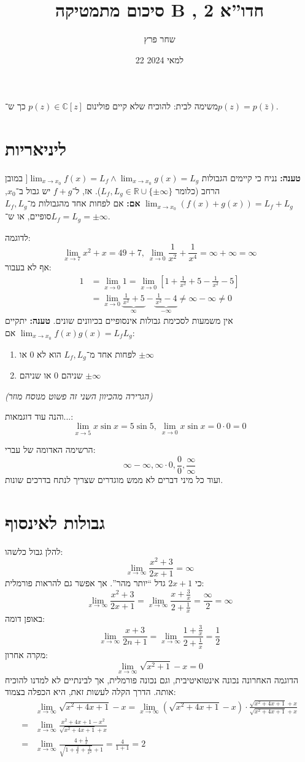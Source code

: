 \documentclass[]{article}
\author{שחר פרץ}
\title{סיכום מתמטיקה B \del, חדו''א 2}
\date{22 למאי 2024}
\newcommand\R     {\mathbb{R}}
\newcommand\C     {\mathbb{C}}
\newcommand\sinx  {\sin x}
\newcommand\limz  {\lim_{x \to 0}}
\newcommand\limxz {\lim_{x \to x_0}}
\newcommand\limi  {\lim_{x \to \infty}}
\renewcommand\inf {\infty}
\begin{document}
	\maketitle
	משימה לבית: להוכיח שלא קיים פולינום $p(z) \in \C[z]$ כך ש־$p(z) = p(\bar z)$. 
	
	\section{ליניאריות}
	\textbf{טענה: }נניח כי קיימים הגבולות $]\limxz f(x) = L_f \land \limxz g(x) = L_g$ במובן הרחב (כלומר $L_f, L_g \in \R\cup \{\pm \inf\}$). אז, ל־$f + g$ יש גבול ב־$x_0$, $\limxz(f(x) + g(x)) = L_f + L_g$ \textbf {אם: }אם לפחות אחד מהגבולות מ־$L_f, L_g$ סופיים, או ש־$L_f = L_g = \pm\inf$. 
	
	לדוגמה: 
	\[ \lim_{x \to 7} x^2 + x = 49 + 7, \ \limz \frac{1}{x^2} + \frac{1}{x^4} = \inf + \inf = \inf \]
	אף לא בעבור: 
	\begin{align}
		1 &= \lim_{x \to 0} 1 = \lim_{x \to 0} \left [ 1 + \frac{1}{x^2} + 5 - \frac{1}{x^2} - 5 \right ] \\
		&= \limz \underbrace{\frac{1}{x^2} + 5}_{\inf} - \underbrace{\frac{1}{x^2} - 4 }_{-\inf} \neq \inf - \inf \neq 0
	\end{align}
	אין משמעות לסכימת גבולות אינסופיים בכיוונים שונים. 
	\textbf{טענה: }יתקיים $\limxz f(x)g(x) = L_fL_g$ אם: 
	\begin{enumerate}
		\item לפחות אחד מ־$L_f, L_g$ הוא לא $0$ או $\pm \inf$
		\item שניהם $0$ או שניהם $\pm\inf$
	\end{enumerate}
	\textit{(הגרירה מהכיוון השני זה פשוט מנוסח מוזר)}
	
	והנה עוד דוגמאות...: 
	\[ \lim_{x \to 5}x \sin x = 5 \sin 5, \ \limz x \sinx = 0 \cdot 0 = 0 \]
	
	הרשימה האדומה של עברי: \color{red} 
	\[ \inf - \inf, \inf \cdot 0, \frac{0}{0}, \frac{\inf}{\inf} \]
	\color{black} ועוד כל מיני דברים לא ממש מוגדרים שצריך לנתח בדרכים שונות. 
	\section{גבולות לאינסוף}
	להלן גבול כלשהו: 
	\[ \limi \frac{x^2 + 3}{2x + 1} = \inf \]
	כי $2x + 1$ גדל ``יותר מהר''. אך אפשר גם להראות פורמלית: 
	\[ \limi \frac{x^2 + 3}{2x + 1} = \limi \frac{x + \frac{3}{x}}{2 + \frac{1}{x}} = \frac{\inf}{2} = \inf \]
	באופן דומה: 
	\[ \limi \frac{x + 3}{2n + 1} = \limi \frac{1 + \frac{3}{x}}{2 + \frac{1}{x}} = \frac{1}{2} \]
	מקרה אחרון: 
	\[ \limi \sqrt{x^2 + 1} - x = 0 \]
	הדוגמה האחרונה נכונה אינטואיטיבית, וגם נכונה פורמלית, אך לבינתיים לא למדנו להוכיח אותה. הדרך הקלה לעשות זאת, היא הכפלה בצמוד: 
	\begin{align}
		&\limi \sqrt{x^2 + 4x + 1} - x = \limi (\sqrt{x^2 + 4x + 1} - x) \cdot \frac{\sqrt{x^2 + 4x + 1} + x}{\sqrt{x^2 + 4x + 1} + x} \\
		=& \limi \frac{x^2 + 4x + 1 - x^2}{\sqrt{x^2 + 4x + 1} + x} \\
		=& \limi \frac{4 + \frac{1}{x}}{\sqrt{1 + \frac{4}{x} + \frac{1}{x^2}} + 1} = \frac{4}{1 + 1} = 2
	\end{align}
	
\end{document}
